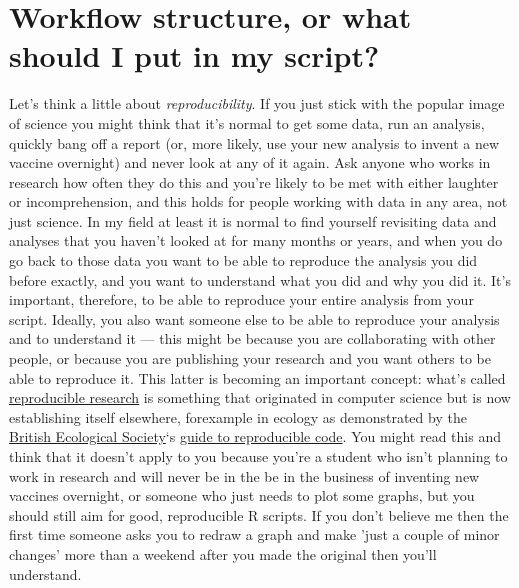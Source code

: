 \documentclass[
]{book}
\begin{document}
\hypertarget{workflow-structure-or-what-should-i-put-in-my-script}{%
\section{Workflow structure, or what should I put in my script?}\label{workflow-structure-or-what-should-i-put-in-my-script}}

Let's think a little about \emph{reproducibility}. If you just stick with the popular image of science you might think that it's normal to get some data, run an analysis, quickly bang off a report (or, more likely, use your new analysis to invent a new vaccine overnight) and never look at any of it again. Ask anyone who works in research how often they do this and you're likely to be met with either laughter or incomprehension, and this holds for people working with data in any area, not just science. In my field at least it is normal to find yourself revisiting data and analyses that you haven't looked at for many months or years, and when you do go back to those data you want to be able to reproduce the analysis you did before exactly, and you want to understand what you did and why you did it. It's important, therefore, to be able to reproduce your entire analysis from your script. Ideally, you also want someone else to be able to reproduce your analysis and to understand it --- this might be because you are collaborating with other people, or because you are publishing your research and you want others to be able to reproduce it. This latter is becoming an important concept: what's called \href{https://en.wikipedia.org/wiki/Reproducibility\#Reproducible_research}{reproducible research} is something that originated in computer science but is now establishing itself elsewhere, forexample in ecology as demonstrated by the \href{https://www.britishecologicalsociety.org/}{British Ecological Society}`s \href{https://www.britishecologicalsociety.org/wp-content/uploads/2017/12/guide-to-reproducible-code.pdf}{guide to reproducible code}. You might read this and think that it doesn't apply to you because you're a student who isn't planning to work in research and will never be in the be in the business of inventing new vaccines overnight, or someone who just needs to plot some graphs, but you should still aim for good, reproducible R scripts. If you don't believe me then the first time someone asks you to redraw a graph and make 'just a couple of minor changes' more than a weekend after you made the original then you'll understand.
\end{document}

